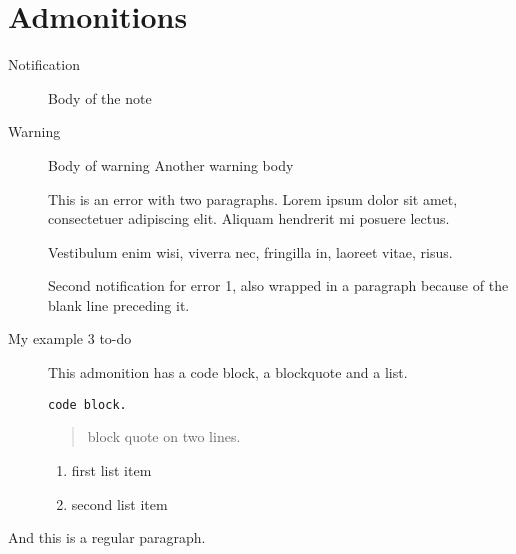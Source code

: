 
\def\mytitle{MultiMarkdown Admonition Test}


\part{Admonitions}
\label{admonitions}

\begin{description}

\item[Notification]

Body of the note
\end{description}

\begin{description}

\item[Warning]

Body of warning
Another warning body
\end{description}

\begin{description}

\item[]

This is an error with two paragraphs. Lorem ipsum
dolor sit amet, consectetuer adipiscing elit. Aliquam
hendrerit mi posuere lectus.

Vestibulum enim wisi, viverra nec, fringilla in, laoreet
vitae, risus.

Second notification for error 1, also wrapped in a paragraph
because of the blank line preceding it.
\end{description}

\begin{description}

\item[My example 3 to-do]

This admonition has a code block, a blockquote and a list.

\begin{verbatim}
code block.
\end{verbatim}

\begin{quote}

block quote
on two lines.
\end{quote}

\begin{enumerate}
\item first list item

\item second list item

\end{enumerate}
\end{description}

And this is a regular paragraph.





